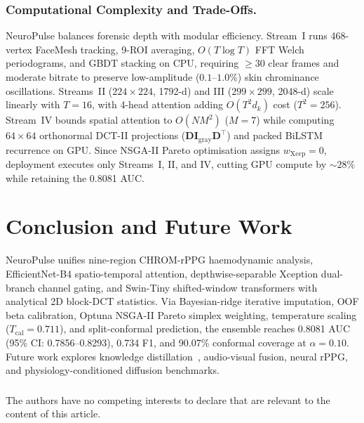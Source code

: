 \documentclass[runningheads]{llncs}
\newcommand{\Tcal}{T_{\mathrm{cal}}}
\begin{document}
\subsubsection{Computational Complexity and Trade-Offs.}
NeuroPulse balances forensic depth with modular efficiency. Stream~I runs 468-vertex FaceMesh tracking, 9-ROI averaging, $O(T\log T)$ FFT Welch periodograms, and GBDT stacking on CPU, requiring $\ge 30$ clear frames and moderate bitrate to preserve low-amplitude ($0.1\text{--}1.0\%$) skin chrominance oscillations. Streams~II ($224{\times}224$, 1792-d) and III ($299{\times}299$, 2048-d) scale linearly with $T{=}16$, with 4-head attention adding $O(T^2 d_k)$ cost ($T^2{=}256$). Stream~IV bounds spatial attention to $O(NM^2)$ ($M{=}7$) while computing $64{\times}64$ orthonormal DCT-II projections ($\mathbf D\mathbf I_{\mathrm{gray}}\mathbf D^{\top}$) and packed BiLSTM recurrence on GPU. Since NSGA-II Pareto optimisation assigns $w_{\mathrm{Xcep}}{=}0$, deployment executes only Streams~I, II, and IV, cutting GPU compute by ${\sim}28\%$ while retaining the 0.8081 AUC.

\section{Conclusion and Future Work}
NeuroPulse unifies nine-region CHROM-rPPG haemodynamic analysis, EfficientNet-B4 spatio-temporal attention, depthwise-separable Xception dual-branch channel gating, and Swin-Tiny shifted-window transformers with analytical 2D block-DCT statistics. Via Bayesian-ridge iterative imputation, OOF beta calibration, Optuna NSGA-II Pareto simplex weighting, temperature scaling ($\Tcal{=}0.711$), and split-conformal prediction, the ensemble reaches 0.8081 AUC (95\% CI: 0.7856--0.8293), 0.734 F1, and 90.07\% conformal coverage at $\alpha{=}0.10$. Future work explores knowledge distillation~\cite{hinton2015distillation}, audio-visual fusion, neural rPPG, and physiology-conditioned diffusion benchmarks.

\begin{credits}
\subsubsection{\discintname} The authors have no competing interests to declare that are relevant to the content of this article.
\end{credits}



\end{document}
